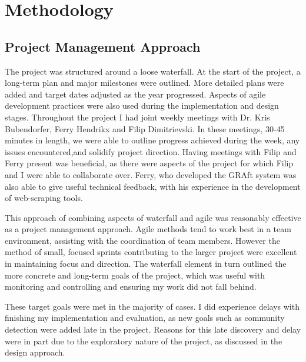 \chapter{Methodology}\label{C:us}

\section{Project Management Approach}

The project was structured around a loose waterfall. At the start of the project, a long-term plan and major milestones were outlined. More detailed plans were added and target dates adjusted as the year progressed. Aspects of agile development practices were also used during the implementation and design stages. Throughout the project I had joint weekly meetings with Dr. Kris Bubendorfer,  Ferry Hendrikx and Filip Dimitrievski. In these meetings, 30-45 minutes in length, we were able to outline progress achieved during the week, any issues encountered,and solidify project direction. Having meetings with Filip and Ferry present was beneficial, as there were aspects of the project for which Filip and I were able to collaborate over. Ferry, who developed the GRAft system was also able to give useful technical feedback, with his experience in the development of web-scraping tools.

This approach of combining aspects of waterfall and agile was reasonably effective as a project management approach. Agile methods tend to work best in a team environment, assisting with the coordination of team members. However the method of small, focused sprints contributing to the larger project were excellent in maintaining focus and direction. The waterfall element in turn outlined the more concrete and long-term goals of the project, which was useful with monitoring and controlling and ensuring my work did not fall behind.

These target goals were met in the majority of cases. I did experience delays with finishing my implementation and evaluation, as new goals such as community detection were added late in the project. Reasons for this late discovery and delay were in part due to the exploratory nature of the project, as discussed in the design approach. %


